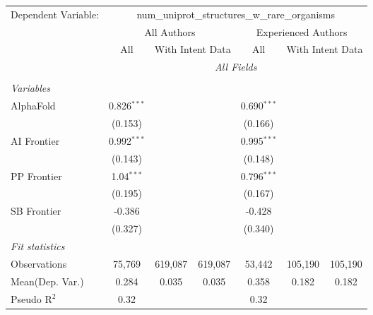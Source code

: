 \begingroup
\centering
\begin{tabular}{lcccccc}
   \tabularnewline \midrule \midrule
   Dependent Variable: & \multicolumn{6}{c}{num\_uniprot\_structures\_w\_rare\_organisms}\\
 & \multicolumn{3}{c}{All Authors} & \multicolumn{3}{c}{Experienced Authors} \\
\cmidrule(lr){2-4} \cmidrule(lr){5-7}
 & \multicolumn{1}{c}{All} & \multicolumn{2}{c}{With Intent Data} & \multicolumn{1}{c}{All} & \multicolumn{2}{c}{With Intent Data} \\
\cmidrule(lr){2-2} \cmidrule(lr){3-4} \cmidrule(lr){5-5} \cmidrule(lr){6-7}
 & \multicolumn{6}{c}{\textit{All Fields}} \\ \\
   \emph{Variables}\\
   AlphaFold    & 0.826$^{***}$ &         &         & 0.690$^{***}$ &         &   \\   
                & (0.153)       &         &         & (0.166)       &         &   \\   
   AI Frontier  & 0.992$^{***}$ &         &         & 0.995$^{***}$ &         &   \\   
                & (0.143)       &         &         & (0.148)       &         &   \\   
   PP Frontier  & 1.04$^{***}$  &         &         & 0.796$^{***}$ &         &   \\   
                & (0.195)       &         &         & (0.167)       &         &   \\   
   SB Frontier  & -0.386        &         &         & -0.428        &         &   \\   
                & (0.327)       &         &         & (0.340)       &         &   \\   
   \midrule
   \emph{Fit statistics}\\
   Observations & 75,769        & 619,087 & 619,087 & 53,442        & 105,190 & 105,190\\  
Mean(Dep. Var.) & 0.284 & 0.035 & 0.035 & 0.358 & 0.182 & 0.182 \\
   Pseudo R$^2$ & 0.32          &         &         & 0.32          &         & \\  
   

\end{tabular}
